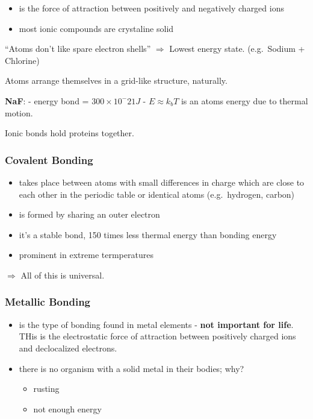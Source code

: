 \begin{itemize}
\tightlist
\item
  is the force of attraction between positively and negatively charged
  ions
\item
  most ionic compounds are crystaline solid
\end{itemize}

``Atoms don't like spare electron shells'' \(\Rightarrow\) Lowest energy
state. (e.g.~Sodium + Chlorine)

Atoms arrange themselves in a grid-like structure, naturally.

\textbf{NaF}: - energy bond = \(300\times 10 ^ -21 J\) -
\(E\approx k_b T\) is an atoms energy due to thermal motion.

Ionic bonds hold proteins together.

\hypertarget{covalent-bonding}{%
\subsubsection{Covalent Bonding}\label{covalent-bonding}}

\begin{itemize}
\tightlist
\item
  takes place between atoms with small differences in charge which are
  close to each other in the periodic table or identical atoms
  (e.g.~hydrogen, carbon)
\item
  is formed by sharing an outer electron
\item
  it's a stable bond, 150 times less thermal energy than bonding energy
\item
  prominent in extreme termperatures
\end{itemize}

\(\Rightarrow\) All of this is universal.

\hypertarget{metallic-bonding}{%
\subsubsection{Metallic Bonding}\label{metallic-bonding}}

\begin{itemize}
\tightlist
\item
  is the type of bonding found in metal elements - \textbf{not important
  for life}. THis is the electrostatic force of attraction between
  positively charged ions and declocalized electrons.
\item
  there is no organism with a solid metal in their bodies; why?

  \begin{itemize}
  \tightlist
  \item
    rusting
  \item
    not enough energy
  \end{itemize}
\end{itemize}

